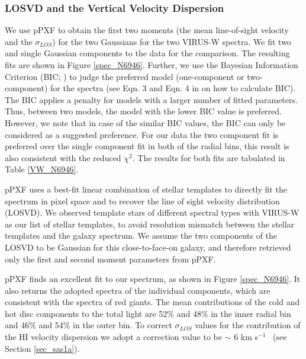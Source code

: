\documentclass[fleqn,usenatbib]{mnras}
\newcommand{\kms}{km s$^{-1}$}
\begin{document}
\subsubsection{LOSVD and the Vertical Velocity Dispersion}
\label{sec_sas1}
We use pPXF \citep{Cappellari2017} to obtain the first two moments (the mean line-of-sight velocity and the $\sigma_{LOS}$) for the two Gaussians for the two VIRUS-W spectra. We fit two and single Gaussian components to the data for the comparison. The resulting fits are shown in Figure \ref{spec_N6946}.  Further, we use the Bayesian Information Criterion (BIC; \citealt{Schwarz:1978}) to judge the preferred model (one-component or two-component) for the spectra (see Eqn. 3 and Eqn. 4 in  on how to calculate BIC). The BIC applies a penalty for models with a larger number of fitted parameters. Thus, between two models, the model with the lower BIC value is preferred. However, we note that in case of the similar BIC values, the BIC can only be considered as a suggested preference. For our data the two component fit is preferred over the single component fit in both of the radial bins, this result is also consistent with the reduced $\chi ^2$. The results for both fits are tabulated in Table \ref{VW_N6946}. %

pPXF uses a best-fit linear combination of stellar templates to directly fit the spectrum in pixel space and to recover the line of sight velocity distribution (LOSVD).  We observed template stars of different spectral types with VIRUS-W as our list of stellar templates, to avoid resolution mismatch between the stellar templates and the galaxy spectrum. We assume the two components of the LOSVD to be Gaussian for this close-to-face-on galaxy, and therefore retrieved only the first and second moment parameters from pPXF. 

pPXF finds an excellent fit to our spectrum, as shown in Figure \ref{spec_N6946}. It also returns the adopted spectra of the individual components, which are consistent with the spectra of red giants. The mean contributions of the cold and hot disc components to the total light are 52\% and 48\% in the inner radial bin and 46\% and 54\% in the outer bin. To correct $\sigma_{LOS}$ values for the contribution of the HI velocity dispersion we adopt a correction value to be $\sim$ 6 \kms\ %
(see Section \ref{sec_sas1a}).
\end{document}
